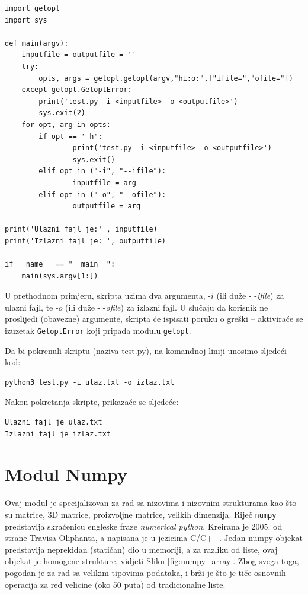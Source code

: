 \begin{verbatim}
import getopt
import sys

def main(argv):
    inputfile = outputfile = ''
    try:
        opts, args = getopt.getopt(argv,"hi:o:",["ifile=","ofile="])
    except getopt.GetoptError:
        print('test.py -i <inputfile> -o <outputfile>')
        sys.exit(2)
    for opt, arg in opts:
        if opt == '-h':
                print('test.py -i <inputfile> -o <outputfile>')
                sys.exit()
        elif opt in ("-i", "--ifile"):
                inputfile = arg
        elif opt in ("-o", "--ofile"):
                outputfile = arg

print('Ulazni fajl je:' , inputfile)
print('Izlazni fajl je: ', outputfile)

if __name__ == "__main__":
    main(sys.argv[1:])
\end{verbatim}
U prethodnom primjeru, skripta uzima dva argumenta, -$i$ (ili duže - -\emph{ifile}) za ulazni fajl, te -$o$ (ili duže - -\emph{ofile}) 
za izlazni fajl. U slučaju da korisnik ne proslijedi (obavezne) argumente, skripta će ispisati poruku o greški -- aktiviraće se izuzetak \texttt{GetoptError} koji pripada modulu \texttt{getopt}. 

 Da bi pokrenuli skriptu (naziva test.py), na komandnoj liniji unosimo sljedeći kod:
 \begin{verbatim}
python3 test.py -i ulaz.txt -o izlaz.txt
 \end{verbatim}
 Nakon pokretanja skripte, prikazaće se sljedeće:
\begin{verbatim}
Ulazni fajl je ulaz.txt
Izlazni fajl je izlaz.txt
 \end{verbatim}

\section{Modul Numpy}

Ovaj modul je specijalizovan za rad sa nizovima i nizovnim strukturama kao što su
matrice, 3D matrice, proizvoljne matrice,  velikih dimenzija. Riječ \texttt{numpy} predstavlja skraćenicu  engleske fraze \emph{numerical python}.  Kreirana je 2005. od strane Travisa Oliphanta, a napisana je u jezicima C/C++. Jedan numpy  objekat predstavlja neprekidan (statičan) dio u memoriji, a za razliku od liste, ovaj objekat je homogene strukture, vidjeti Sliku 	\ref{fig:numpy_array}. Zbog svega toga, pogodan je   za rad  sa velikim tipovima podataka, i brži je što je tiče osnovnih operacija za red velicine (oko 50 puta) od tradicionalne liste.

